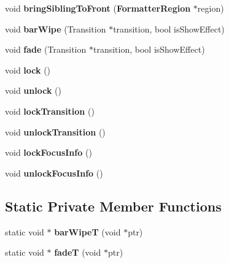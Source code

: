 \begin{CompactItemize}
\item 
void \textbf{bringSiblingToFront} ({\bf FormatterRegion} $\ast$region)\label{classbr_1_1pucrio_1_1telemidia_1_1ginga_1_1ncl_1_1model_1_1presentation_1_1FormatterRegion_60d45f9ae91d3f4ac830fc2b71f5717d}

\item 
void \textbf{barWipe} (Transition $\ast$transition, bool isShowEffect)\label{classbr_1_1pucrio_1_1telemidia_1_1ginga_1_1ncl_1_1model_1_1presentation_1_1FormatterRegion_ecdd615af5a415fa10947d8cd0a56ebf}

\item 
void \textbf{fade} (Transition $\ast$transition, bool isShowEffect)\label{classbr_1_1pucrio_1_1telemidia_1_1ginga_1_1ncl_1_1model_1_1presentation_1_1FormatterRegion_292bce1b5d5cb99dfeea15e2556b15ba}

\item 
void \textbf{lock} ()\label{classbr_1_1pucrio_1_1telemidia_1_1ginga_1_1ncl_1_1model_1_1presentation_1_1FormatterRegion_a81aed607133209dade63a226818224d}

\item 
void \textbf{unlock} ()\label{classbr_1_1pucrio_1_1telemidia_1_1ginga_1_1ncl_1_1model_1_1presentation_1_1FormatterRegion_9278be8203e1c42e2619179882ae4403}

\item 
void \textbf{lockTransition} ()\label{classbr_1_1pucrio_1_1telemidia_1_1ginga_1_1ncl_1_1model_1_1presentation_1_1FormatterRegion_1263581bf83ab548c6f89b8d393214ae}

\item 
void \textbf{unlockTransition} ()\label{classbr_1_1pucrio_1_1telemidia_1_1ginga_1_1ncl_1_1model_1_1presentation_1_1FormatterRegion_f47d2415eb94d527664600872061dd51}

\item 
void \textbf{lockFocusInfo} ()\label{classbr_1_1pucrio_1_1telemidia_1_1ginga_1_1ncl_1_1model_1_1presentation_1_1FormatterRegion_15f0784f262cf922dd0593ed72fda4cb}

\item 
void \textbf{unlockFocusInfo} ()\label{classbr_1_1pucrio_1_1telemidia_1_1ginga_1_1ncl_1_1model_1_1presentation_1_1FormatterRegion_842829617537da578f0ea76f0c8bfad3}

\end{CompactItemize}
\subsection*{Static Private Member Functions}
\begin{CompactItemize}
\item 
static void $\ast$ \textbf{barWipeT} (void $\ast$ptr)\label{classbr_1_1pucrio_1_1telemidia_1_1ginga_1_1ncl_1_1model_1_1presentation_1_1FormatterRegion_c1e5ab9f2309783b6d9bcd7f6246a4c6}

\item 
static void $\ast$ \textbf{fadeT} (void $\ast$ptr)\label{classbr_1_1pucrio_1_1telemidia_1_1ginga_1_1ncl_1_1model_1_1presentation_1_1FormatterRegion_76e0bee8a99b2e6c35a93dad2bcef641}

\end{CompactItemize}
